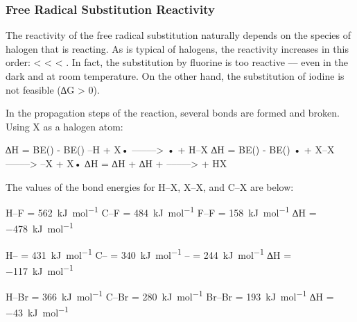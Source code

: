 

		\subsubsection{Free Radical Substitution Reactivity}

			The reactivity of the free radical substitution naturally depends on the species of halogen that is reacting.
			As is typical of halogens, the reactivity increases in this order:  <  <  < .
			In fact, the substitution by fluorine is too reactive –– even in the dark and at room temperature. On the other hand,
			the substitution of iodine is not feasible (∆G > 0).

			In the propagation steps of the reaction, several bonds are formed and broken. Using X as a halogen atom:

			\vspace{1em}
			\vbox{∆H = BE() - BE()		\tabto{60mm}–H + X•		\tabto{85mm} –––––> • + H–X	}
			\vbox{∆H = BE() - BE()		\tabto{60mm}• + X–X		\tabto{85mm} –––––> –X + X•	}
			\vbox{∆H = ∆H + ∆H	\tabto{60mm} + 	\tabto{85mm} –––––>  + HX	}

			The values of the bond energies for H–X, X–X, and C–X are below:
			\vspace{1.0em}

			\vbox{
						\tabto{25mm}	H–F			\tabto{50mm} = \SI{562}{\kilo\joule\per\mole}
							\tabto{25mm}	C–F			\tabto{50mm} = \SI{484}{\kilo\joule\per\mole}
							\tabto{25mm}	F–F			\tabto{50mm} = \SI{158}{\kilo\joule\per\mole}
							\tabto{25mm}	∆H	\tabto{50mm} = \SI{-478}{\kilo\joule\per\mole}
			}

			\vspace{1.0em}
			\vbox{
					\tabto{25mm}	H–\ch{\chlorine}				\tabto{50mm} = \SI{431}{\kilo\joule\per\mole}
								\tabto{25mm}	C–\ch{\chlorine}				\tabto{50mm} = \SI{340}{\kilo\joule\per\mole}
								\tabto{25mm}	\ch{\chlorine}–	\tabto{50mm} = \SI{244}{\kilo\joule\per\mole}
								\tabto{25mm}	∆H						\tabto{50mm} = \SI{-117}{\kilo\joule\per\mole}
			}

			\vspace{1.0em}
			\vbox{
					\tabto{25mm}	H–Br		\tabto{50mm} = \SI{366}{\kilo\joule\per\mole}
							\tabto{25mm}	C–Br		\tabto{50mm} = \SI{280}{\kilo\joule\per\mole}
							\tabto{25mm}	Br–Br		\tabto{50mm} = \SI{193}{\kilo\joule\per\mole}
							\tabto{25mm}	∆H	\tabto{50mm} = \SI{-43}{\kilo\joule\per\mole}
			}

